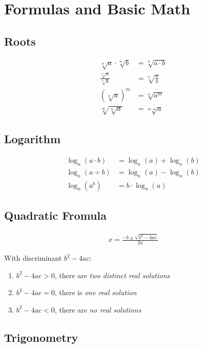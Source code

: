 \section{Formulas and Basic Math}

\subsection{Roots}

\begin{align*}
    \sqrt[n]{a}\cdot\sqrt[n]{b} & = \sqrt[n]{a\cdot b} \\
    \frac{\sqrt[n]{a}}{\sqrt[n]{b}} & = \sqrt[n]{\frac{a}{b}} \\
    (\sqrt[n]{a})^m & = \sqrt[n]{a^m} \\
    \sqrt[m]{\sqrt[n]{a}} & = \sqrt[m\cdot n]{a}
\end{align*}

\subsection{Logarithm}

\begin{align*}
    \log_n(a\cdot b) & = \log_n(a) + \log_n(b) \\
    \log_n(a\div b) & = \log_n(a) - \log_n(b) \\
    \log_n(a^b) & = b \cdot \log_n(a)
\end{align*}

\subsection{Quadratic Fromula}
\begin{align*}
    x = \frac{-b\pm\sqrt{b^2 - 4ac}}{2a}
\end{align*}

With discriminant $b^2-4ac$:
\begin{enumerate}
    \item $b^2-4ac > 0$, there are \em{two distinct real solutions}
    \item $b^2-4ac = 0$, there is \em{one real solution}
    \item $b^2-4ac < 0$, there are \em{no real solutions}
\end{enumerate}

\subsection{Trigonometry}

